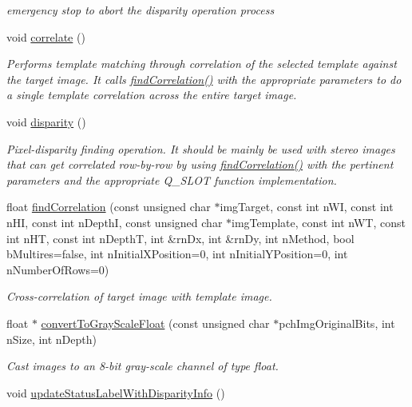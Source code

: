 \begin{CompactItemize}
\begin{CompactList}\small\item\em emergency stop to abort the disparity operation process \item\end{CompactList}\item 
\hypertarget{classQcorr_ce91b9d83b34887735737323bac5431e}{
void \hyperlink{classQcorr_ce91b9d83b34887735737323bac5431e}{correlate} ()}
\label{classQcorr_ce91b9d83b34887735737323bac5431e}

\begin{CompactList}\small\item\em Performs template matching through correlation of the selected template against the target image. It calls \hyperlink{classQcorr_05dcc1b0be4596b355df235264180da4}{findCorrelation()} with the appropriate parameters to do a single template correlation across the entire target image. \item\end{CompactList}\item 
\hypertarget{classQcorr_640ee4c76350e5886deddbf4f0d50594}{
void \hyperlink{classQcorr_640ee4c76350e5886deddbf4f0d50594}{disparity} ()}
\label{classQcorr_640ee4c76350e5886deddbf4f0d50594}

\begin{CompactList}\small\item\em Pixel-disparity finding operation. It should be mainly be used with stereo images that can get correlated row-by-row by using \hyperlink{classQcorr_05dcc1b0be4596b355df235264180da4}{findCorrelation()} with the pertinent parameters and the appropriate Q\_\-SLOT function implementation. \item\end{CompactList}\item 
float \hyperlink{classQcorr_05dcc1b0be4596b355df235264180da4}{findCorrelation} (const unsigned char $\ast$imgTarget, const int nWI, const int nHI, const int nDepthI, const unsigned char $\ast$imgTemplate, const int nWT, const int nHT, const int nDepthT, int \&rnDx, int \&rnDy, int nMethod, bool bMultires=false, int nInitialXPosition=0, int nInitialYPosition=0, int nNumberOfRows=0)
\begin{CompactList}\small\item\em Cross-correlation of target image with template image. \item\end{CompactList}\item 
float $\ast$ \hyperlink{classQcorr_d1b26ace597c0c4a0f64a0bd9576d4fc}{convertToGrayScaleFloat} (const unsigned char $\ast$pchImgOriginalBits, int nSize, int nDepth)
\begin{CompactList}\small\item\em Cast images to an 8-bit gray-scale channel of type float. \item\end{CompactList}\item 
\hypertarget{classQcorr_bdd5c95c41d1103249d54c1ce34eecb2}{
void \hyperlink{classQcorr_bdd5c95c41d1103249d54c1ce34eecb2}{updateStatusLabelWithDisparityInfo} ()}
\label{classQcorr_bdd5c95c41d1103249d54c1ce34eecb2}


\end{CompactItemize}
